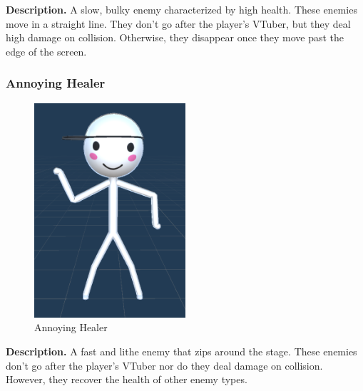 \documentclass[10pt, a4paper]{article}
\begin{document}
	\textbf{Description.} A slow, bulky enemy characterized by high health. These enemies move in a straight line. They don't go after the player's VTuber, but they deal high damage on collision. Otherwise, they disappear once they move past the edge of the screen.

	\subsubsection{Annoying Healer}

	\begin{figure}[H]
		\centering
		\includegraphics[width=0.5\textwidth]{images/annoying_healer1.png}
		\caption{Annoying Healer}
		\label{fig:annoyinghealer}
	\end{figure}

	\textbf{Description.} A fast and lithe enemy that zips around the stage. These enemies don't go after the player's VTuber nor do they deal damage on collision. However, they recover the health of other enemy types.
\end{document}
